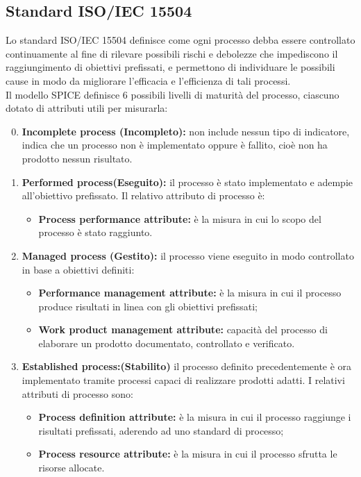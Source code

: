 \subsection{Standard ISO/IEC 15504} \label{subsection:ISO/IEC15504}
Lo standard ISO/IEC 15504 definisce come ogni processo debba essere controllato
continuamente al fine di rilevare possibili rischi e debolezze che impediscono il raggiungimento di obiettivi prefissati, e permettono di individuare le possibili cause in modo da migliorare l'efficacia e l'efficienza di tali processi. \\
Il modello SPICE definisce 6 possibili livelli di maturità del processo, ciascuno dotato di attributi utili per misurarla:
\noindent \begin{enumerate}
	\setcounter{enumi}{-1} 
	\item \textbf{Incomplete process (Incompleto):} non include nessun tipo di indicatore, indica che un processo non è implementato oppure è fallito, cioè non ha prodotto nessun risultato.
	\item \textbf{Performed process(Eseguito):} il processo è stato implementato e adempie all’obiettivo prefissato. Il relativo attributo di processo è:
	\begin{itemize}
		\item \textbf{Process performance attribute:} è la misura in cui lo scopo del processo è stato raggiunto.
	\end{itemize}
	\item \textbf{Managed process (Gestito):} il processo viene eseguito in modo controllato in base a obiettivi definiti:
	\begin{itemize}
		\item \textbf{Performance management attribute:} è la misura in cui il processo produce risultati in linea con gli obiettivi prefissati;
		\item \textbf{Work product management attribute:} capacità del processo di elaborare un prodotto documentato, controllato e verificato.
	\end{itemize}
	\item \textbf{Established process:(Stabilito)} il processo definito precedentemente è ora implementato tramite processi capaci di realizzare prodotti adatti. I relativi attributi di processo sono:
	\begin{itemize}
		\item \textbf{Process definition attribute:} è la misura in cui il processo raggiunge i risultati prefissati, aderendo ad uno standard di processo;
		\item \textbf{Process resource attribute:} è la misura in cui il processo sfrutta le risorse allocate.

\end{itemize}
\end{enumerate}
